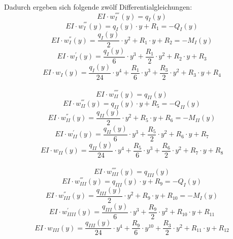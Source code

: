 \noindent Dadurch ergeben sich folgende zwölf Differentialgleichungen:
\begin{equation}
	EI\cdot w_{I}^{''''}(y) = q_{I}(y)
\end{equation}
\begin{equation}
	EI\cdot w_{I}^{'''}(y) = q_{I}(y)\cdot y + R_{1} = -Q_{I}(y)
\end{equation}
\begin{equation}
	EI\cdot w_{I}^{''}(y) = \frac{q_{I}(y)}{2}\cdot y^{2} + R_{1}\cdot y + R_{2} = -M_{I}(y)
\end{equation}
\begin{equation}
	EI\cdot w_{I}^{'}(y) = \frac{q_{I}(y)}{6}\cdot y^{3} + \frac{R_{1}}{2}\cdot y^{2} + R_{2}\cdot y + R_{3} 
\end{equation}
\begin{equation}
	EI\cdot w_{I}(y) = \frac{q_{I}(y)}{24}\cdot y^{4} + \frac{R_{1}}{6}\cdot y^{3} + \frac{R_{3}}{2}\cdot y^{2} + R_{3}\cdot y + R_{4}
\end{equation}\\
\begin{equation}
	EI\cdot w_{II}^{''''}(y) = q_{II}(y)
\end{equation}
\begin{equation}
	EI\cdot w_{II}^{'''}(y) = q_{II}(y)\cdot y + R_{5} = -Q_{II}(y)
\end{equation}
\begin{equation}
	EI\cdot w_{II}^{''}(y) = \frac{q_{II}(y)}{2}\cdot y^{2} + R_{5}\cdot y + R_{6} = -M_{II}(y)
\end{equation}
\begin{equation}
	EI\cdot w_{II}^{'}(y) = \frac{q_{II}(y)}{6}\cdot y^{3} + \frac{R_{5}}{2}\cdot y^{2} + R_{6}\cdot y + R_{7} 
\end{equation}
\begin{equation}
	EI\cdot w_{II}(y) = \frac{q_{II}(y)}{24}\cdot y^{4} + \frac{R_{5}}{6}\cdot y^{3} + \frac{R_{6}}{2}\cdot y^{2} + R_{7}\cdot y + R_{8}
\end{equation}\\
\begin{equation}
EI\cdot w_{III}^{''''}(y) = q_{III}(y)
\end{equation}
\begin{equation}
EI\cdot w_{III}^{'''}(y) = q_{III}(y)\cdot y + R_{9} = -Q_{I}(y)
\end{equation}
\begin{equation}
EI\cdot w_{III}^{''}(y) = \frac{q_{III}(y)}{2}\cdot y^{2} + R_{9}\cdot y + R_{10} = -M_{I}(y)
\end{equation}
\begin{equation}
EI\cdot w_{IIII}^{'}(y) = \frac{q_{III}(y)}{6}\cdot y^{3} + \frac{R_{9}}{2}\cdot y^{2} + R_{10}\cdot y + R_{11} 
\end{equation}
\begin{equation}
EI\cdot w_{III}(y) = \frac{q_{III}(y)}{24}\cdot y^{4} + \frac{R_{9}}{6}\cdot y^{10} + \frac{R_{3}}{2}\cdot y^{2} + R_{11}\cdot y + R_{12}
\end{equation}\\

